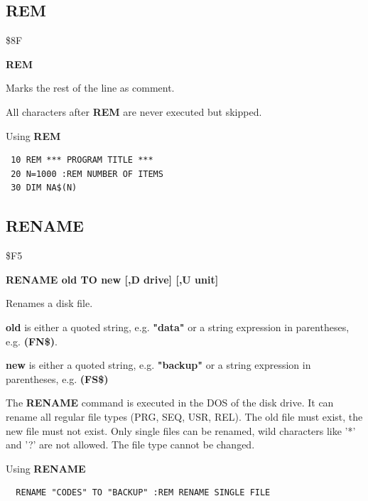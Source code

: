 
\newpage
\subsection{REM}
\begin{description}[leftmargin=2cm,style=nextline]
\item [Token:] \$8F
\item [Format:] {\bf REM}
\item [Usage:]  Marks the rest of the line as comment.

                All characters after {\bf REM} are never executed
                but skipped.

\item [Example:] Using {\bf REM}

\begin{tcolorbox}[colback=black,coltext=white]
\verbatimfont{\codefont}
\begin{verbatim}
 10 REM *** PROGRAM TITLE ***
 20 N=1000 :REM NUMBER OF ITEMS
 30 DIM NA$(N)
\end{verbatim}
\end{tcolorbox}
\end{description}


\newpage
\subsection{RENAME}
\begin{description}[leftmargin=2cm,style=nextline]
\item [Token:] \$F5
\item [Format:] {\bf RENAME old TO new [,D drive] [,U unit] }
\item [Usage:] Renames a disk file.

   {\bf old} is either a quoted string, e.g. {\bf "data"} or
   a string expression in parentheses, e.g. {\bf (FN\$)}.

   {\bf new} is either a quoted string, e.g. {\bf "backup"} or
   a string expression in parentheses, e.g. {\bf (FS\$)}

   \drivedefinition

   \unitdefinition

\item [Remarks:]
   The {\bf RENAME} command is executed in the DOS of the disk drive.
   It can rename all regular file types (PRG, SEQ, USR, REL).
   The old file must exist, the new file must not exist.
   Only single files can be renamed, wild characters like
   '*' and '?' are not allowed. The file type cannot be changed.

\item [Example:] Using {\bf RENAME}
\begin{tcolorbox}[colback=black,coltext=white]
\verbatimfont{\codefont}
\begin{verbatim}
  RENAME "CODES" TO "BACKUP" :REM RENAME SINGLE FILE
\end{verbatim}
\end{tcolorbox}
\end{description}

